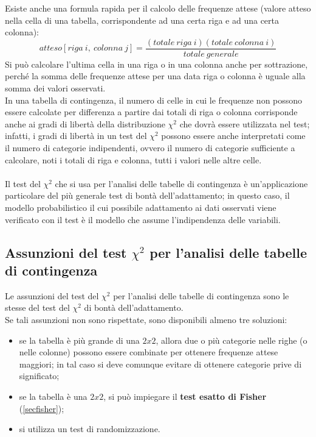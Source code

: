 \documentclass[10pt, draft]{book}
\newcommand{\tightlist}{%
\setlength{\itemsep}{1pt}\setlength{\parskip}{0pt}\setlength{\parsep}{0pt}}
\begin{document}
Esiste anche una formula rapida per il calcolo delle frequenze attese (valore atteso nella cella di una tabella, corrispondente ad una certa riga e ad una certa colonna):
\begin{equation}
    atteso[riga\ i,\ colonna\ j] = \frac{(totale\ riga\ i)(totale\ colonna\ i)}{totale\ generale}
\end{equation}
Si può calcolare l'ultima cella in una riga o in una colonna anche per sottrazione, perché la somma delle frequenze attese per una data riga o colonna è uguale alla somma dei valori osservati.
\\
In una tabella di contingenza, il numero di celle in cui le frequenze non possono essere calcolate per differenza a partire dai totali di riga o colonna corrisponde anche ai gradi di libertà della distribuzione $\chi^2$ che dovrà essere utilizzata nel test; infatti, i gradi di libertà in un test del $\chi^2$ possono essere anche interpretati come il numero di categorie indipendenti, ovvero il numero di categorie sufficiente a calcolare, noti i totali di riga e colonna, tutti i valori nelle altre celle.
\\
\\
Il test del $\chi^2$ che si usa per l'analisi delle tabelle di contingenza è un'applicazione particolare del più generale test di bontà dell'adattamento; in questo caso, il modello probabilistico il cui possibile adattamento ai dati osservati viene verificato con il test è il modello che assume l'indipendenza delle variabili.

\subsection{Assunzioni del test \texorpdfstring{$\chi^2$}{Lg} per l'analisi delle tabelle di contingenza}
Le assunzioni del test del $\chi^2$ per l'analisi delle tabelle di contingenza sono le stesse del test del $\chi^2$ di bontà dell'adattamento.
\\
Se tali assunzioni non sono rispettate, sono disponibili almeno tre soluzioni:
\begin{itemize} \tightlist
    \item se la tabella è più grande di una $2x2$, allora due o più categorie nelle righe (o nelle colonne) possono essere combinate per ottenere frequenze attese maggiori; in tal caso si deve comunque evitare di ottenere categorie prive di significato;
    \item se la tabella è una $2x2$, si può impiegare il \textbf{test esatto di Fisher} (\ref{secfisher});
    \item si utilizza un test di randomizzazione. %
\end{itemize}
\end{document}
